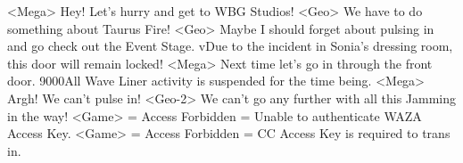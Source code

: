 <Mega> Hey! Let's hurry and get to WBG Studios! 
<Geo> We have to do something about Taurus Fire! 
<Geo> Maybe I should forget about pulsing in and go check out the Event Stage. 
vDue to the incident in Sonia's dressing room, this door will remain locked! 
<Mega> Next time let's go in through the front door. 
{90}{00}All Wave Liner activity is suspended for the time being. 
<Mega> Argh! We can't pulse in! 
<Geo-2> We can't go any further with all this Jamming in the way! 
<Game> = Access Forbidden = Unable to authenticate WAZA Access Key. 
<Game> = Access Forbidden = CC Access Key is required to trans in. 
